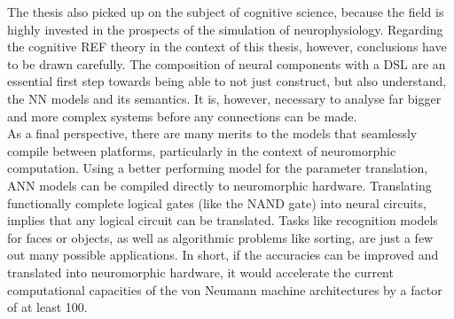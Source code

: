 \documentclass[report.tex]{subfiles}
\begin{document}
The thesis also picked up on the subject of cognitive science, because the field
is highly invested in the prospects of the simulation of neurophysiology.
Regarding the cognitive REF theory in the context of this thesis, however,
conclusions have to be drawn carefully.
The composition of neural components with a \gls{DSL} are an essential first
step towards being able to not just construct, but also understand, the 
\gls{NN} models and its semantics.
It is, however, necessary to analyse far bigger and more complex systems before
any connections can be made.
\\[0.1cm]

As a final perspective, there are many merits to the models that seamlessly
compile between platforms, particularly in the context of neuromorphic
computation.
Using a better performing model for the parameter translation, \gls{ANN} models can
be compiled directly to neuromorphic hardware.
Translating functionally complete logical gates (like the NAND gate) into neural
circuits, implies that any logical circuit can be translated.
Tasks like recognition models for faces or objects, as well as algorithmic
problems like sorting, are just a few out many possible applications.
In short, if the accuracies can be improved and translated into neuromorphic hardware, it
would accelerate the current computational capacities of the von Neumann machine
architectures by a factor of at least 100.
\\[0.1cm]

\FloatBarrier
\end{document}
